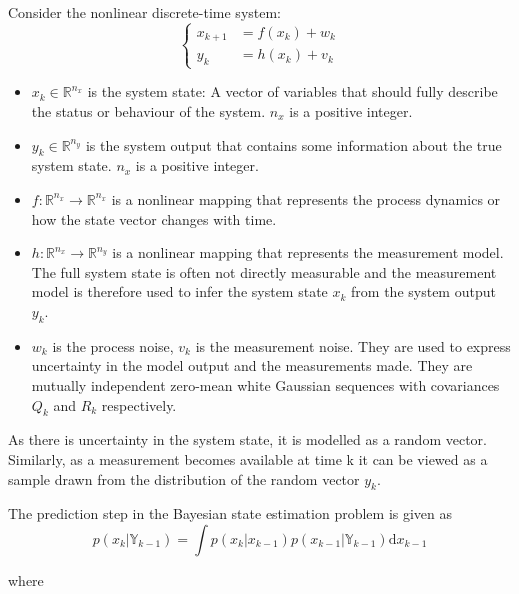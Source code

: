 Consider the nonlinear discrete-time system:
\begin{equation}
\left\{\begin{aligned}
x_{k+1} &=f\left(x_{k}\right)+w_{k} \\
y_{k} &=h\left(x_{k}\right)+v_{k}
\end{aligned}\right.
\end{equation}

\begin{itemize}
	\item $x_{k} \in \mathbb{R}^{n_{x}}$ is the system state: A vector of variables that should fully describe the status or behaviour of the system. $n_{x}$ is a positive integer.
	\item $y_{k} \in \mathbb{R}^{n_{y}}$ is the system output that contains some information about the true system state. $n_{x}$ is a positive integer.
	\item $f: \mathbb{R}^{n_{x}} \rightarrow \mathbb{R}^{n_{x}}$ is a nonlinear mapping that represents the process dynamics or how the state vector changes with time. 
	\item $h: \mathbb{R}^{n_{x}} \rightarrow \mathbb{R}^{n_{y}}$ is a nonlinear mapping that represents the measurement model. The full system state is often not directly measurable and the measurement model is therefore used to infer the system state $x_{k}$ from the system output $y_{k}$.
	\item $w_{k}$ is the process noise, $v_{k}$ is the measurement noise. They are used to express uncertainty in the model output and the measurements made. They are mutually independent zero-mean white Gaussian sequences with covariances $Q_{k}$ and $R_{k}$ respectively.
\end{itemize}

As there is uncertainty in the system state, it is modelled as a random vector. Similarly, as a measurement becomes available at time k it can be viewed as a sample drawn from the distribution of the random vector $y_k$.



The prediction step in the Bayesian state estimation problem is given as 
\begin{equation}
p\left(x_{k} | \mathbb{Y}_{k-1}\right)=\int p\left(x_{k} | x_{k-1}\right) p\left(x_{k-1} | \mathbb{Y}_{k-1}\right) \mathrm{d} x_{k-1}
\end{equation}

where 

